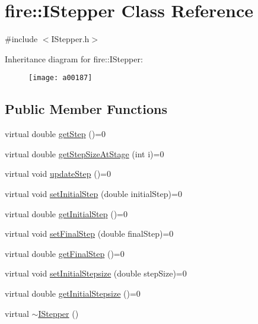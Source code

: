 \hypertarget{a00187}{}\section{fire\+:\+:I\+Stepper Class Reference}
\label{a00187}


{\ttfamily \#include $<$I\+Stepper.\+h$>$}

Inheritance diagram for fire\+:\+:I\+Stepper\+:\begin{figure}[H]
\begin{center}
\leavevmode
\texttt{[image: a00187]}
\end{center}
\end{figure}
\subsection*{Public Member Functions}
\begin{DoxyCompactItemize}
\item 
virtual double \hyperlink{a00187_a7f709d1462a2a3b8bd8214cc681ca26e}{get\+Step} ()=0
\item 
virtual double \hyperlink{a00187_a43027c0c268afcd59db8815c2e2c41ea}{get\+Step\+Size\+At\+Stage} (int i)=0
\item 
virtual void \hyperlink{a00187_a44dfccb90ee5ef6e080b54113c215458}{update\+Step} ()=0
\item 
virtual void \hyperlink{a00187_a3a5099cd0f3c874e56c33cb8f13b8f3b}{set\+Initial\+Step} (double initial\+Step)=0
\item 
virtual double \hyperlink{a00187_a49df3a2ac05cebaf2baf387b66d19272}{get\+Initial\+Step} ()=0
\item 
virtual void \hyperlink{a00187_add76974a7b6fbbc93916270a376c461e}{set\+Final\+Step} (double final\+Step)=0
\item 
virtual double \hyperlink{a00187_ab234d9f032e02668aededf1c22e8c0a9}{get\+Final\+Step} ()=0
\item 
virtual void \hyperlink{a00187_a69c262f248511efcd271be1724a41ad9}{set\+Initial\+Stepsize} (double step\+Size)=0
\item 
virtual double \hyperlink{a00187_afb777e62386b25e5a38d59af54972690}{get\+Initial\+Stepsize} ()=0
\item 
virtual \hyperlink{a00187_ac8ec460d35512e2e039396d5192eb57e}{$\sim$\+I\+Stepper} ()
\end{DoxyCompactItemize}


